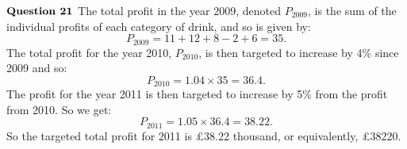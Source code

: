 \documentclass{article}
\begin{document}
$\textbf{Question 21} \\$
The total profit in the year 2009, denoted $P_{2009}$, is the sum of the individual profits of each category of drink, and so is given by:
$$P_{2009}= 11+12+8-2+6 = 35.$$
The total profit for the year 2010, $P_{2010}$, is then targeted to increase by 4$\%$ since 2009 and so:
$$P_{2010}= 1.04 \times 35 = 36.4.$$
The profit for the year 2011 is then targeted to increase by 5$\%$ from the profit from 2010. So we get:
$$P_{2011} = 1.05 \times 36.4 = 38.22.$$
So the targeted total profit for 2011 is £38.22 thousand, or equivalently, £38220.
\end{document}
